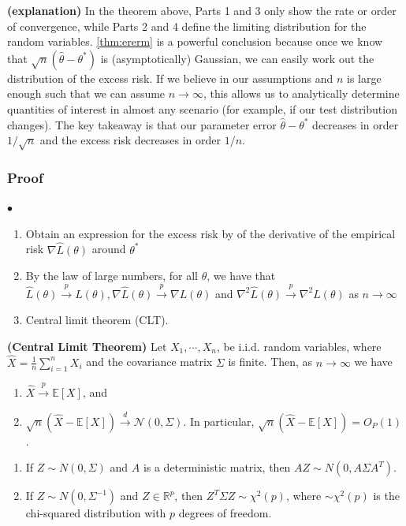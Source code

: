 \documentclass{article}
\newcommand{\bfs}[1]{\textbf{({#1}) }}
\begin{document}
\begin{rema}\bfs{explanation}
In the theorem above, Parts 1 and 3 only show the rate or order of convergence, while Parts 2 and 4 define the limiting distribution for the random variables. \cref{thm:ererm} is a powerful conclusion because once we know that $\sqrt{n}\left(\hat{\theta}-\theta^{*}\right)$ is (asymptotically) Gaussian, we can easily work out the distribution of the excess risk. If we believe in our assumptions and $n$ is large enough such that we can assume $n \rightarrow \infty$, this allows us to analytically determine quantities of interest in almost any scenario (for example, if our test distribution changes). The key takeaway is that our parameter error $\hat{\theta}-\theta^{*}$ decreases in order $1 / \sqrt{n}$ and the excess risk decreases in order $1 / n$.
\end{rema} 
\subsubsection{Proof}
$\bullet$ 
\begin{enumerate}
    \item Obtain an expression for the excess risk by  of the derivative of the empirical risk $\nabla \widehat{L}(\theta)$ around $\theta^{*}$
    \item By the law of large numbers, for all $\theta$, we have that $\widehat{L}(\theta) \stackrel{p}{\rightarrow} L(\theta), \nabla \widehat{L}(\theta) \stackrel{p}{\rightarrow} \nabla L(\theta)$ and $\nabla^{2} \hat{L}(\theta) \stackrel{p}{\rightarrow} \nabla^{2} L(\theta)$ as $n \rightarrow \infty$
    \item Central limit theorem (CLT).
\end{enumerate}

\begin{lema}\bfs{Central Limit Theorem}
Let $X_{1}, \cdots, X_{n}$, be i.i.d. random variables, where $\widehat{X}=\frac{1}{n} \sum_{i=1}^{n} X_{i}$ and the covariance matrix $\Sigma$ is finite. Then, as $n \rightarrow \infty$ we have
\begin{enumerate}
    \item $\widehat{X} \stackrel{p}{\rightarrow} \mathbb{E}[X]$, and
    \item $\sqrt{n}(\widehat{X}-\mathbb{E}[X]) \stackrel{d}{\rightarrow} \mathcal{N}(0, \Sigma) .$ In particular, $\sqrt{n}(\widehat{X}-\mathbb{E}[X])=O_{P}(1)$.
\end{enumerate}
\end{lema}
\begin{lema}\text{ }
\begin{enumerate}
    \item If $Z \sim N(0, \Sigma)$ and $A$ is a deterministic matrix, then $A Z \sim N\left(0, A \Sigma A^{T}\right)$.
    \item If $Z \sim N\left(0, \Sigma^{-1}\right)$ and $Z \in \mathbb{R}^{p}$, then $Z^{T} \Sigma Z \sim \chi^{2}(p)$, where $\sim \chi^{2}(p)$ is the chi-squared distribution with $p$ degrees of freedom.
\end{enumerate}
\end{lema}
\end{document}
